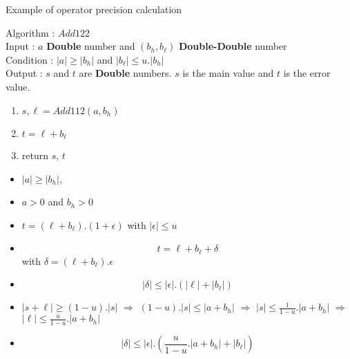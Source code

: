  \begin{frame}{Example of operator precision calculation}
   \tiny 
  \begin{algo}{Algorithm : \textbf{$Add122$}}\\
Input : $a$ \textbf{Double} number and $(b_h,b_{\ell})$  \textbf{Double-Double} number\\
Condition : $\lvert a \rvert \ge \lvert b_h \rvert $ and $\lvert b_{\ell} \rvert \le u. \lvert b_h \rvert$\\
Output : $s$ and $t$ are \textbf{Double} numbers. $s$ is the main value and $t$ is the error value.
\begin{enumerate}
\item $s,\ell = Add112(a,b_h)$\\ 
 \item   $t = \ell +b_{\ell}$\\ 
 \item   return $s$, $t$
\end{enumerate}
\end{algo}
\begin{itemize}
    \item $\lvert a \rvert \ge \lvert b_h \rvert$,
    \item $a > 0$ and $b_h > 0$ 
    \item $t = (\ell +b_{\ell}).(1+\epsilon)$ with $\lvert \epsilon \rvert \le u$
    \item $$t = \ell + b_{\ell} + \delta$$
with  $\delta = (\ell   + b_{\ell}) .\epsilon$
    \item $$\lvert \delta \rvert \le \lvert \epsilon \rvert .(\lvert \ell   \rvert + \lvert  b_{\ell}\rvert)$$ 
    \item  $\lvert s+\ell \rvert \ge (1-u).\lvert s \rvert$ $\Rightarrow$
$(1-u).\lvert s \rvert \le \lvert a + b_h \rvert$ $\Rightarrow$ $\lvert s \rvert \le \frac{1}{1-u}.\lvert a + b_h \rvert$ $\Rightarrow$ $\lvert \ell \rvert \le \frac{u}{1-u}.\lvert a + b_h \rvert$
\item  $$\lvert \delta \rvert \le  \lvert \epsilon \rvert .( \frac{u}{1-u}.\lvert a + b_h \rvert + \lvert  b_{\ell}\rvert)$$ 

\end{itemize} 
\end{frame}
